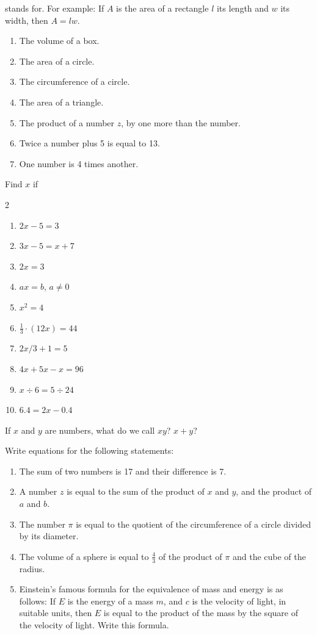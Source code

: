\documentclass[11pt]{book}
\begin{document}
\begin{exlist}
      stands for. For example: If $A$ is the area of a rectangle $l$ its length
      and $w$ its width, then $A = lw$.
  \begin{enumerate}[label=(\alph*), leftmargin=2.2em, itemsep=1pt, topsep=2pt]
  \item The volume of a box.
  \item The area of a circle.
  \item The circumference of a circle.
  \item The area of a triangle.
  \item The product of a number $z$, by one more than the number.
  \item Twice a number plus 5 is equal to 13.
  \item One number is 4 times another.
  \end{enumerate}
\item Find $x$ if
  \begin{multicols}{2}
  \begin{enumerate}[label=(\alph*), leftmargin=2.2em, itemsep=1pt, topsep=2pt]
  \item $2x - 5 = 3$
  \item $3x - 5 = x + 7$
  \item $2x = 3$
  \item $ax = b$, $a \neq 0$
  \item $x^2 = 4$
  \item $\frac{1}{3} \cdot (12x) = 44$
  \item $2x/3 + 1 = 5$
  \item $4x + 5x - x = 96$
  \item $x \div 6 = 5 \div 24$
  \item $6.4 = 2x - 0.4$
  \end{enumerate}
  \end{multicols}
\item If $x$ and $y$ are numbers, what do we call $xy$? $x + y$?
\item Write equations for the following statements:
  \begin{enumerate}[label=(\alph*), leftmargin=2.2em, itemsep=1pt, topsep=2pt]
  \item The sum of two numbers is 17 and their difference is 7.
  \item A number $z$ is equal to the sum of the product of $x$ and $y$, and the
        product of $a$ and $b$.
  \item The number $\pi$ is equal to the quotient of the circumference of a
        circle divided by its diameter.
  \item The volume of a sphere is equal to $\frac{4}{3}$ of the product of $\pi$
        and the cube of the radius.
  \item Einstein's famous formula for the equivalence of mass and energy is as
        follows: If $E$ is the energy of a mass $m$, and $c$ is the velocity of
        light, in suitable units, then $E$ is equal to the product of the mass by
        the square of the velocity of light. Write this formula.
  \end{enumerate}
\end{exlist}
\end{document}
